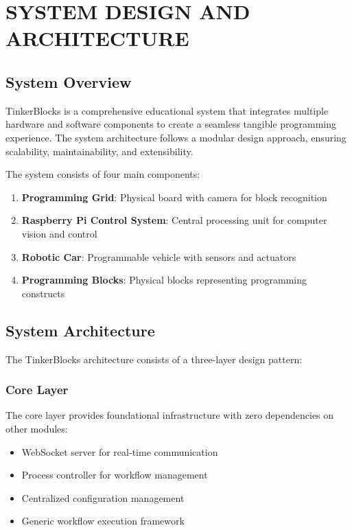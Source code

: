 \chapter{SYSTEM DESIGN AND ARCHITECTURE}

\section{System Overview}

TinkerBlocks is a comprehensive educational system that integrates multiple hardware and software components to create a seamless tangible programming experience. The system architecture follows a modular design approach, ensuring scalability, maintainability, and extensibility.

The system consists of four main components:
\begin{enumerate}
    \item \textbf{Programming Grid}: Physical board with camera for block recognition
    \item \textbf{Raspberry Pi Control System}: Central processing unit for computer vision and control
    \item \textbf{Robotic Car}: Programmable vehicle with sensors and actuators
    \item \textbf{Programming Blocks}: Physical blocks representing programming constructs
\end{enumerate}

\section{System Architecture}

The TinkerBlocks architecture consists of a three-layer design pattern:

\subsection{Core Layer}
The core layer provides foundational infrastructure with zero dependencies on other modules:
\begin{itemize}
    \item WebSocket server for real-time communication
    \item Process controller for workflow management
    \item Centralized configuration management
    \item Generic workflow execution framework
\end{itemize}

